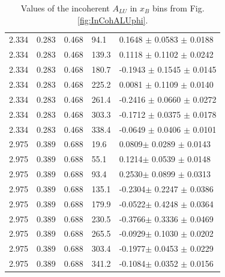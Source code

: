\documentclass[aps,prc,preprint,superscriptaddress]{revtex4}
\begin{document}
\begin{table}[!h]
\begin{center}
\begin{tabular}{||l|l|l|l|l||}
  2.334 & 0.283 & 0.468 &  94.1  &  0.1648 $\pm$ 0.0583  $\pm$  0.0188 \\
  2.334 & 0.283 & 0.468 & 139.3  &  0.1118 $\pm$ 0.1102  $\pm$  0.0242 \\
  2.334 & 0.283 & 0.468 & 180.7  & -0.1943 $\pm$ 0.1545  $\pm$  0.0145 \\
  2.334 & 0.283 & 0.468 & 225.2  &  0.0081 $\pm$ 0.1109  $\pm$  0.0140 \\
  2.334 & 0.283 & 0.468 & 261.4  & -0.2416 $\pm$ 0.0660  $\pm$  0.0272 \\
  2.334 & 0.283 & 0.468 & 303.3  & -0.1712 $\pm$ 0.0375  $\pm$  0.0178 \\
  2.334 & 0.283 & 0.468 & 338.4  & -0.0649 $\pm$ 0.0406  $\pm$  0.0101 \\
  \hline
  2.975 & 0.389 & 0.688 &   19.6 &   0.0809$\pm$  0.0289 $\pm$  0.0143 \\
  2.975 & 0.389 & 0.688 &   55.1 &   0.1214$\pm$  0.0539 $\pm$  0.0148 \\
  2.975 & 0.389 & 0.688 &   93.4 &   0.2530$\pm$  0.0899 $\pm$  0.0313 \\
  2.975 & 0.389 & 0.688 &  135.1 &  -0.2304$\pm$  0.2247 $\pm$  0.0386 \\
  2.975 & 0.389 & 0.688 &  179.9 &  -0.0522$\pm$  0.4248 $\pm$  0.0364 \\
  2.975 & 0.389 & 0.688 &  230.5 &  -0.3766$\pm$  0.3336 $\pm$  0.0469 \\
  2.975 & 0.389 & 0.688 &  265.5 &  -0.0929$\pm$  0.1030 $\pm$  0.0202 \\
  2.975 & 0.389 & 0.688 &  303.4 &  -0.1977$\pm$  0.0453 $\pm$  0.0229 \\
  2.975 & 0.389 & 0.688 &  341.2 &  -0.1084$\pm$  0.0352 $\pm$  0.0156 \\
 \hline
 \hline
 \end{tabular}
 \caption{Values of the incoherent $A_{LU}$ in $x_B$ bins from Fig. \ref{fig:InCohALUphi}.}
 \label{table:InCoh_xB_BSA}
 \end{center}
\end{table}
\end{document}
